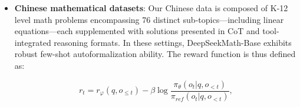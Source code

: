 {\begin{itemize}[topsep=0pt]
\begin{itemize}[topsep=0pt]
\begin{itemize}[topsep=0pt]
\begin{itemize}[topsep=0pt]
\begin{itemize}
    \item  \textbf{Supervised Fine-tuning (SFT)}: SFT involves updating a pretrained model using curated human-annotated data. \end{itemize}

\paragraph{Results}
The empirical outcomes under these varied regimes are presented in Table \ref{tab:code-math} and Table \ref{tab:code-math-general-eval}. \item \textbf{Chinese mathematical datasets}: Our Chinese data is composed of K-12 level math problems encompassing 76 distinct sub-topics—including linear equations—each supplemented with solutions presented in CoT and tool-integrated reasoning formats. In these settings, DeepSeekMath-Base exhibits robust few-shot autoformalization ability. The reward function is thus defined as:

\begin{equation}
    r_{t} = r_\varphi(q, o_{\le t}) - \beta \log\frac{\pi_{\theta}(o_{t}|q, o_{<t})}{\pi_{ref}(o_{t}|q, o_{<t})},
\label{eq:PPO-reward}
\end{equation}


\end{itemize}
\end{itemize}
\end{itemize}
\end{itemize}}
